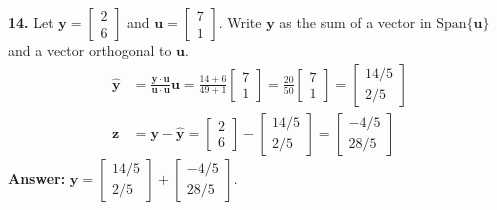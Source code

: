 \documentclass[11pt, letterpaper]{article}
\theoremstyle{definition}
\theoremstyle{remark}
\begin{document}
\textbf{14.} Let $\mathbf{y} = \begin{bmatrix} 2 \\ 6 \end{bmatrix}$ and $\mathbf{u} = \begin{bmatrix} 7 \\ 1 \end{bmatrix}$. Write $\mathbf{y}$ as the sum of a vector in $\text{Span}\{\mathbf{u}\}$ and a vector orthogonal to $\mathbf{u}$.
\begin{align*}
    \hat{\mathbf{y}} &= \frac{\mathbf{y} \cdot \mathbf{u}}{\mathbf{u} \cdot \mathbf{u}} \mathbf{u} = \frac{14 + 6}{49 + 1} \begin{bmatrix} 7 \\ 1 \end{bmatrix} = \frac{20}{50} \begin{bmatrix} 7 \\ 1 \end{bmatrix} = \begin{bmatrix} 14/5 \\ 2/5 \end{bmatrix} \\
    \mathbf{z} &= \mathbf{y} - \hat{\mathbf{y}} = \begin{bmatrix} 2 \\ 6 \end{bmatrix} - \begin{bmatrix} 14/5 \\ 2/5 \end{bmatrix} = \begin{bmatrix} -4/5 \\ 28/5 \end{bmatrix}
\end{align*}
\textbf{Answer:} $\mathbf{y} = \begin{bmatrix} 14/5 \\ 2/5 \end{bmatrix} + \begin{bmatrix} -4/5 \\ 28/5 \end{bmatrix}$.
\end{document}
